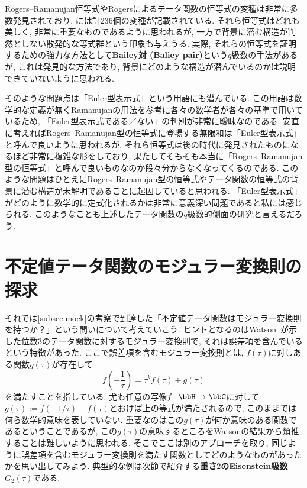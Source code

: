 \documentclass[11pt,b5paper,oneside,lualatex]{ltjsarticle} %
\numberwithin{equation}{section} %
\begin{document}
\begin{rem}{}{}
	Rogers--Ramanujan恒等式やRogersによるテータ関数の恒等式の変種は非常に多数発見されており, \cite[付録A]{魅惑}には計236個の変種が記載されている. 
	それら恒等式はどれも美しく, 非常に重要なものであるように思われるが, 一方で背景に潜む構造が判然としない散発的な等式群という印象も与えうる. 
	実際, それらの恒等式を証明するための強力な方法として\textbf{Bailey対 (Baliey pair)}という$ q $級数の手法があるが, これは発見的な方法であり, 背景にどのような構造が潜んでいるのかは説明できていないように思われる. 
	
	そのような問題点は「Euler型表示式」という用語にも潜んでいる. 
	この用語は数学的な定義が無くRamanujanの用法を参考に各々の数学者が各々の基準で用いているため, 「Euler型表示式である／ない」の判別が非常に曖昧なのである. 
	安直に考えればRogers--Ramanujan型の恒等式に登場する無限和は「Euler型表示式」と呼んで良いように思われるが, それら恒等式は後の時代に発見されたものになるほど非常に複雑な形をしており, 果たしてそもそも本当に「Rogers--Ramanujan型の恒等式」と呼んで良いものなのか段々分からなくなってくるのである. 
	このような問題はひとえにRogers--Ramanujan型の恒等式やテータ関数の恒等式の背景に潜む構造が未解明であることに起因していると思われる. 
	「Euler型表示式」がどのように数学的に定式化されるかは非常に意義深い問題であると私には感じられる. 
	このようなことも上述したテータ関数の$ q $級数的側面の研究と言えるだろう. 
\end{rem}


\section{不定値テータ関数のモジュラー変換則の探求} \label{sec:indefinite_theta}


それでは\cref{subsec:mock}の考察で到達した「不定値テータ関数はモジュラー変換則を持つか？」という問いについて考えていこう. 
ヒントとなるのはWatson~\cite[pp. 78]{Watson}が示した位数$ 3 $のテータ関数に対するモジュラー変換則で, それは誤差項を含んでいるという特徴があった.
ここで誤差項を含むモジュラー変換則とは, $ f(\tau) $に対しある関数$ g(\tau) $が存在して
\[
f \left( -\frac{1}{\tau} \right) = \tau^k f(\tau) + g(\tau)
\]
を満たすことを指している. 
尤も任意の写像$ f \colon \bbH \to \bbC $に対して$ g(\tau) := f(-1/\tau) - f(\tau) $とおけば上の等式が満たされるので, このままでは何ら数学的意味を表していない. 
重要なのはこの$ g(\tau) $が何か意味のある関数であるということであるが, この$ g(\tau) $の意味するところをWatsonの結果から類推することは難しいように思われる. 
そこでここは別のアプローチを取り, 同じように誤差項を含むモジュラー変換則を満たす関数としてどのようなものがあったかを思い出してみよう. 
典型的な例は次節で紹介する\textbf{重さ$ 2 $のEisenstein級数}$ G_2(\tau) $である. 
\end{document}
